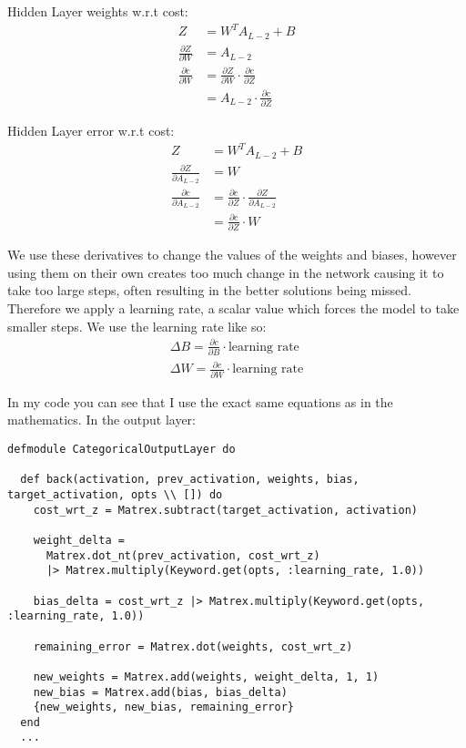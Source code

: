 Hidden Layer weights w.r.t cost:
\begin{equation}
    \begin{aligned}
        Z &= W^{T}A_{L-2} + B\\
        \frac{\partial Z}{\partial W} &= A_{L-2}\\[2em]
        \frac{\partial c}{\partial W} &= \frac{\partial Z}{\partial W} \cdot \frac{\partial c}{\partial Z}\\
                                      &= A_{L-2} \cdot \frac{\partial c}{\partial Z}
    \end{aligned}
\end{equation}

Hidden Layer error w.r.t cost:
\begin{equation}
    \begin{aligned}
        Z &= W^{T}A_{L-2} + B\\
        \frac{\partial Z}{\partial A_{L-2}} &= W\\[2em]
        \frac{\partial c}{\partial A_{L-2}} &= \frac{\partial c}{\partial Z} \cdot \frac{\partial Z}{\partial A_{L-2}}\\
                                      &= \frac{\partial c}{\partial Z} \cdot W
    \end{aligned}
\end{equation}

We use these derivatives to change the values of the weights and biases, however
using them on their own creates too much change in the network causing it to
take too large steps, often resulting in the better solutions being missed.
Therefore we apply a learning rate, a scalar value which forces the model to take smaller steps.
We use the learning rate like so:
\begin{equation}
    \begin{aligned}
        \Delta B = \frac{\partial c}{\partial B} \cdot \text{learning rate}\\[1em]
        \Delta W = \frac{\partial c}{\partial W} \cdot \text{learning rate} 
    \end{aligned}
\end{equation}

In my code you can see that I use the exact same equations as in the mathematics.
In the output layer:
\begin{lstlisting}
defmodule CategoricalOutputLayer do

  def back(activation, prev_activation, weights, bias, target_activation, opts \\ []) do
    cost_wrt_z = Matrex.subtract(target_activation, activation)

    weight_delta =
      Matrex.dot_nt(prev_activation, cost_wrt_z)
      |> Matrex.multiply(Keyword.get(opts, :learning_rate, 1.0))

    bias_delta = cost_wrt_z |> Matrex.multiply(Keyword.get(opts, :learning_rate, 1.0))

    remaining_error = Matrex.dot(weights, cost_wrt_z)

    new_weights = Matrex.add(weights, weight_delta, 1, 1)
    new_bias = Matrex.add(bias, bias_delta)
    {new_weights, new_bias, remaining_error}
  end
  ...
\end{lstlisting}

